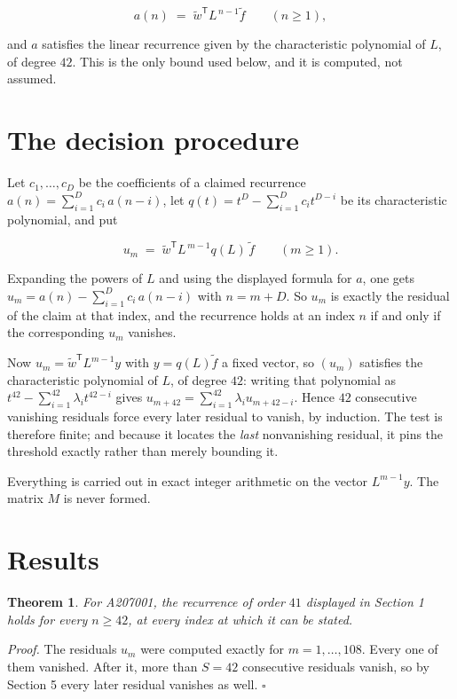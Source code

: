\documentclass[11pt]{article}
\newtheorem{theorem}{Theorem}
\theoremstyle{definition}
\begin{document}
\[a(n) \;=\; \tilde w^{\mathsf T} L^{\,n-1} \tilde f \qquad (n \ge 1),\]

and $a$ satisfies the linear recurrence given by the characteristic polynomial of $L$, of degree $42$. This is the only bound used below, and it is computed, not assumed.

\section{The decision procedure}

Let $c_1,\dots,c_D$ be the coefficients of a claimed recurrence $a(n) = \sum_{i=1}^{D} c_i\,a(n-i)$, let $q(t) = t^{D} - \sum_{i=1}^{D} c_i t^{D-i}$ be its characteristic polynomial, and put

\[u_m \;=\; \tilde w^{\mathsf T} L^{\,m-1} q(L)\,\tilde f \qquad (m \ge 1).\]

Expanding the powers of $L$ and using the displayed formula for $a$, one gets $u_m = a(n) - \sum_{i=1}^{D} c_i\,a(n-i)$ with $n = m + D$. So $u_m$ is exactly the residual of the claim at that index, and the recurrence holds at an index $n$ if and only if the corresponding $u_m$ vanishes.

Now $u_m = \tilde w^{\mathsf T} L^{m-1} y$ with $y = q(L)\tilde f$ a fixed vector, so $(u_m)$ satisfies the characteristic polynomial of $L$, of degree $42$: writing that polynomial as $t^{42} - \sum_{i=1}^{42} \lambda_i t^{42-i}$ gives $u_{m+42} = \sum_{i=1}^{42} \lambda_i u_{m+42-i}$. Hence $42$ consecutive vanishing residuals force every later residual to vanish, by induction. The test is therefore finite; and because it locates the {\itshape last} nonvanishing residual, it pins the threshold exactly rather than merely bounding it.

Everything is carried out in exact integer arithmetic on the vector $L^{m-1}y$. The matrix $M$ is never formed.

\section{Results}

\begin{theorem} For A207001, the recurrence of order $41$ displayed in Section 1 holds for every $n \ge 42$, at every index at which it can be stated.\end{theorem}

{\itshape Proof.} The residuals $u_m$ were computed exactly for $m = 1,\dots,108$. Every one of them vanished. After it, more than $S = 42$ consecutive residuals vanish, so by Section 5 every later residual vanishes as well. $\square$
\end{document}
